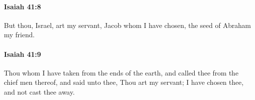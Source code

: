 		\paragraph{Isaiah 41:8} %
			\label{ISAIAH-41-8}

			But thou, Israel, art my servant, Jacob whom I have chosen, the seed of Abraham my friend.


		\paragraph{Isaiah 41:9} %
			\label{ISAIAH-41-9}

			Thou whom I have taken from the ends of the earth, and called thee from the chief men thereof, and said unto thee, Thou art my servant; I have chosen thee, and not cast thee away.


